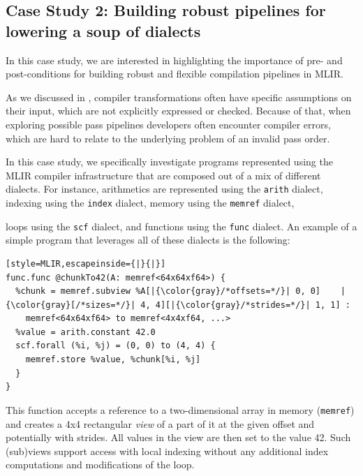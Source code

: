 \documentclass[screen,nonacm,authorversion]{acmart}
\begin{document}
\subsection{Case Study 2: Building robust pipelines for lowering a soup of dialects}
In this case study, we are interested in highlighting the importance of pre- and post-conditions for building robust and flexible compilation pipelines in MLIR.



As we discussed in , compiler transformations often have specific assumptions on their input, which are not explicitly expressed or checked.
Because of that, when exploring possible pass pipelines developers often encounter compiler errors, which are hard to relate to the underlying problem of an invalid pass order.

In this case study, we specifically investigate programs represented using the MLIR compiler infrastructure that are composed out of a mix of different dialects. For instance, arithmetics are represented using the \texttt{arith} dialect, indexing using the \texttt{index} dialect, memory using the \texttt{memref} dialect,

loops using the \texttt{scf} dialect, and functions using the \texttt{func} dialect. An example of a simple program that leverages all of these dialects is the following:
\begin{lstlisting}[style=MLIR,escapeinside={|}{|}]
func.func @chunkTo42(A: memref<64x64xf64>) {
  %chunk = memref.subview %A[|{\color{gray}/*offsets=*/}| 0, 0]    |{\color{gray}[/*sizes=*/}| 4, 4][|{\color{gray}/*strides=*/}| 1, 1] :
    memref<64x64xf64> to memref<4x4xf64, ...>
  %value = arith.constant 42.0
  scf.forall (%i, %j) = (0, 0) to (4, 4) {
    memref.store %value, %chunk[%i, %j]
  }
}
\end{lstlisting}

This function accepts a reference to a two-dimensional array in memory (\texttt{memref}) and creates a 4x4 rectangular \emph{view} of a part of it at the given offset and potentially with strides. All values in the view are then set to the value 42. Such (sub)views support access with local indexing without any additional index computations and modifications of the loop.
\end{document}
